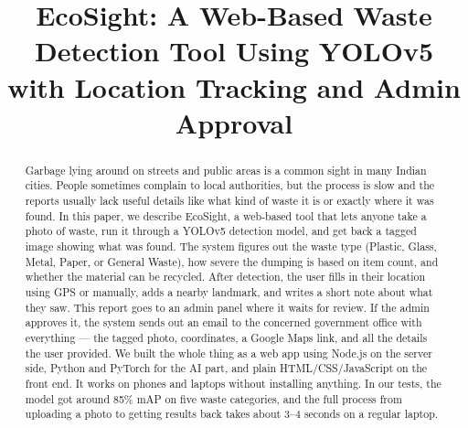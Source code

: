 \documentclass[conference]{IEEEtran}
\begin{document}
\title{EcoSight: A Web-Based Waste Detection Tool Using YOLOv5 with Location Tracking and Admin Approval}

\author{
}


\maketitle

\begin{abstract}
Garbage lying around on streets and public areas is a common sight in many Indian cities. People sometimes complain to local authorities, but the process is slow and the reports usually lack useful details like what kind of waste it is or exactly where it was found. In this paper, we describe EcoSight, a web-based tool that lets anyone take a photo of waste, run it through a YOLOv5 detection model, and get back a tagged image showing what was found. The system figures out the waste type (Plastic, Glass, Metal, Paper, or General Waste), how severe the dumping is based on item count, and whether the material can be recycled. After detection, the user fills in their location using GPS or manually, adds a nearby landmark, and writes a short note about what they saw. This report goes to an admin panel where it waits for review. If the admin approves it, the system sends out an email to the concerned government office with everything — the tagged photo, coordinates, a Google Maps link, and all the details the user provided. We built the whole thing as a web app using Node.js on the server side, Python and PyTorch for the AI part, and plain HTML/CSS/JavaScript on the front end. It works on phones and laptops without installing anything. In our tests, the model got around 85\% mAP on five waste categories, and the full process from uploading a photo to getting results back takes about 3–4 seconds on a regular laptop.
\end{abstract}
\end{document}

